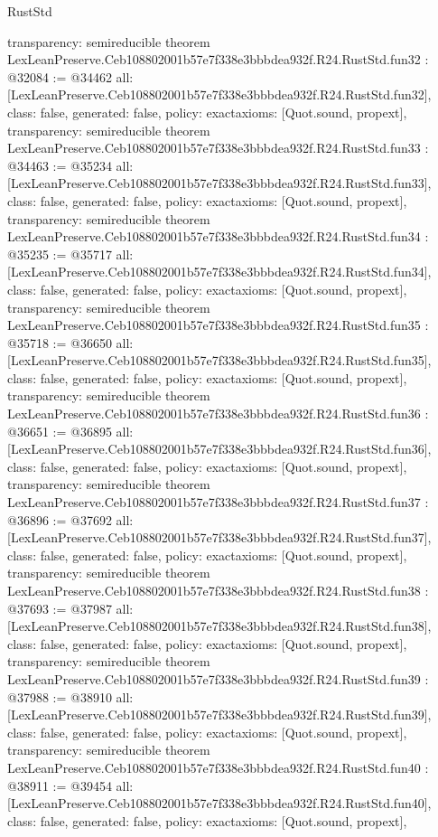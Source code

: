 \begin{lexlean}{RustStd}
\begin{coremodule}
{  transparency: semireducible
}
theorem LexLeanPreserve.Ceb108802001b57e7f338e3bbbdea932f.R24.RustStd.fun32 : @32084 := @34462 {
  all: [LexLeanPreserve.Ceb108802001b57e7f338e3bbbdea932f.R24.RustStd.fun32],
  class: false,
  generated: false,
  policy: exact{axioms: [Quot.sound, propext]},
  transparency: semireducible
}
theorem LexLeanPreserve.Ceb108802001b57e7f338e3bbbdea932f.R24.RustStd.fun33 : @34463 := @35234 {
  all: [LexLeanPreserve.Ceb108802001b57e7f338e3bbbdea932f.R24.RustStd.fun33],
  class: false,
  generated: false,
  policy: exact{axioms: [Quot.sound, propext]},
  transparency: semireducible
}
theorem LexLeanPreserve.Ceb108802001b57e7f338e3bbbdea932f.R24.RustStd.fun34 : @35235 := @35717 {
  all: [LexLeanPreserve.Ceb108802001b57e7f338e3bbbdea932f.R24.RustStd.fun34],
  class: false,
  generated: false,
  policy: exact{axioms: [Quot.sound, propext]},
  transparency: semireducible
}
theorem LexLeanPreserve.Ceb108802001b57e7f338e3bbbdea932f.R24.RustStd.fun35 : @35718 := @36650 {
  all: [LexLeanPreserve.Ceb108802001b57e7f338e3bbbdea932f.R24.RustStd.fun35],
  class: false,
  generated: false,
  policy: exact{axioms: [Quot.sound, propext]},
  transparency: semireducible
}
theorem LexLeanPreserve.Ceb108802001b57e7f338e3bbbdea932f.R24.RustStd.fun36 : @36651 := @36895 {
  all: [LexLeanPreserve.Ceb108802001b57e7f338e3bbbdea932f.R24.RustStd.fun36],
  class: false,
  generated: false,
  policy: exact{axioms: [Quot.sound, propext]},
  transparency: semireducible
}
theorem LexLeanPreserve.Ceb108802001b57e7f338e3bbbdea932f.R24.RustStd.fun37 : @36896 := @37692 {
  all: [LexLeanPreserve.Ceb108802001b57e7f338e3bbbdea932f.R24.RustStd.fun37],
  class: false,
  generated: false,
  policy: exact{axioms: [Quot.sound, propext]},
  transparency: semireducible
}
theorem LexLeanPreserve.Ceb108802001b57e7f338e3bbbdea932f.R24.RustStd.fun38 : @37693 := @37987 {
  all: [LexLeanPreserve.Ceb108802001b57e7f338e3bbbdea932f.R24.RustStd.fun38],
  class: false,
  generated: false,
  policy: exact{axioms: [Quot.sound, propext]},
  transparency: semireducible
}
theorem LexLeanPreserve.Ceb108802001b57e7f338e3bbbdea932f.R24.RustStd.fun39 : @37988 := @38910 {
  all: [LexLeanPreserve.Ceb108802001b57e7f338e3bbbdea932f.R24.RustStd.fun39],
  class: false,
  generated: false,
  policy: exact{axioms: [Quot.sound, propext]},
  transparency: semireducible
}
theorem LexLeanPreserve.Ceb108802001b57e7f338e3bbbdea932f.R24.RustStd.fun40 : @38911 := @39454 {
  all: [LexLeanPreserve.Ceb108802001b57e7f338e3bbbdea932f.R24.RustStd.fun40],
  class: false,
  generated: false,
  policy: exact{axioms: [Quot.sound, propext]},
}
\end{coremodule}
\end{lexlean}
